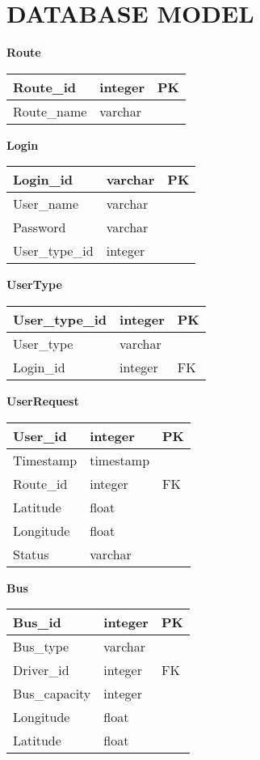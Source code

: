 \section{DATABASE MODEL}
\setlength{\parindent}{0em}
\textbf{Route}
\begin{table}[H]
	\centering
	\begin{tabular}{| m{4cm} | m{4cm} | m{4cm} |}
		\hline
		Route\_id & integer & PK\\
		\hline
		Route\_name & varchar & \\
		\hline
	\end{tabular}
\end{table}
\textbf{Login}
\begin{table}[H]
	\centering
	\begin{tabular}{| m{4cm} | m{4cm} | m{4cm} |}
		\hline
		Login\_id & varchar & PK\\
		\hline
		User\_name & varchar & \\
		\hline
		Password & varchar & \\
		\hline
		User\_type\_id & integer & \\
		\hline
	\end{tabular}
\end{table}
\textbf{UserType}
\begin{table}[H]
	\centering
	\begin{tabular}{| m{4cm} | m{4cm} | m{4cm} |}
		\hline
		User\_type\_id & integer & PK\\
		\hline
		User\_type & varchar & \\
		\hline
		Login\_id & integer & FK\\
		\hline
	\end{tabular}
\end{table}
\textbf{UserRequest}
\begin{table}[H]
	\centering
	\begin{tabular}{| m{4cm} | m{4cm} | m{4cm} |}
		\hline
		User\_id & integer & PK\\
		\hline
		Timestamp & timestamp & \\
		\hline
		Route\_id & integer & FK\\
		\hline
		Latitude & float & \\
		\hline
		Longitude & float & \\
		\hline
		Status & varchar & \\
		\hline
	\end{tabular}
\end{table}
\textbf{Bus}
\begin{table}[H]
	\centering
	\begin{tabular}{| m{4cm} | m{4cm} | m{4cm} |}
		\hline
		Bus\_id & integer & PK\\
		\hline
		Bus\_type & varchar & \\
		\hline
		Driver\_id & integer & FK\\
		\hline
		Bus\_capacity & integer & \\
		\hline
		Longitude & float & \\
		\hline
		Latitude & float & \\
		\hline
	\end{tabular}
\end{table}
